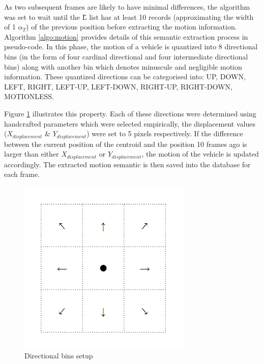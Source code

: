 As two subsequent frames are likely to have minimal differences, the algorithm was set to wait until the \H{L} list has at least 10 records (approximating the width of 1 $\alpha_T$) of the previous position before extracting the motion information.
Algorithm \ref{algo:motion} provides details of this semantic extraction process in pseudo-code.
In this phase, the motion of a vehicle is quantized into 8 directional bins (in the form of four cardinal directional and four intermediate directional bins) along with another bin which denotes minuscule and negligible motion information.
These quantized directions can be categorised into: UP, DOWN, LEFT, RIGHT, LEFT-UP, LEFT-DOWN, RIGHT-UP, RIGHT-DOWN, MOTIONLESS.

Figure \ref{fig:cardinalbins} illustrates this property.
Each of these directions were determined using handcrafted parameters which were selected empirically, the displacement values ($X_{displacement}$ \& $Y_{displacement}$) were set to 5 pixels respectively.
If the difference between the current position of the centroid and the position 10 frames ago is larger than either $X_{displacement}$ or $Y_{displacement}$, the motion of the vehicle is updated accordingly.
The extracted motion semantic is then saved into the database for each frame.

\begin{figure}[H]\centering
\includegraphics[width=.5\textwidth]{image/new/motion.PNG}
\caption{Directional bins setup}
\label{fig:cardinalbins}
\end{figure}


